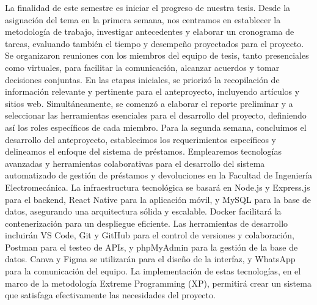 La finalidad de este semestre es iniciar el progreso de nuestra tesis. Desde la asignación del
tema en la primera semana, nos centramos en establecer la metodología de trabajo, investigar
antecedentes y elaborar un cronograma de tareas, evaluando también el tiempo y desempeño
proyectados para el proyecto. Se organizaron reuniones con los miembros del equipo de tesis, tanto
presenciales como virtuales, para facilitar la comunicación, alcanzar acuerdos y tomar decisiones
conjuntas.
En las etapas iniciales, se priorizó la recopilación de información relevante y pertinente para
el anteproyecto, incluyendo artículos y sitios web. Simultáneamente, se comenzó a elaborar el
reporte preliminar y a seleccionar las herramientas esenciales para el desarrollo del proyecto,
definiendo así los roles específicos de cada miembro.
Para la segunda semana, concluimos el desarrollo del anteproyecto, establecimos los
requerimientos específicos y delineamos el enfoque del sistema de préstamos. Emplearemos
tecnologías avanzadas y herramientas colaborativas para el desarrollo del sistema automatizado de
gestión de préstamos y devoluciones en la Facultad de Ingeniería Electromecánica. La
infraestructura tecnológica se basará en Node.js y Express.js para el backend, React Native para la
aplicación móvil, y MySQL para la base de datos, asegurando una arquitectura sólida y escalable.
Docker facilitará la contenerización para un despliegue eficiente.
Las herramientas de desarrollo incluirán VS Code, Git y GitHub para el control de
versiones y colaboración, Postman para el testeo de APIs, y phpMyAdmin para la gestión de la base
de datos. Canva y Figma se utilizarán para el diseño de la interfaz, y WhatsApp para la
comunicación del equipo. La implementación de estas tecnologías, en el marco de la metodología
Extreme Programming (XP), permitirá crear un sistema que satisfaga efectivamente las necesidades
del proyecto.